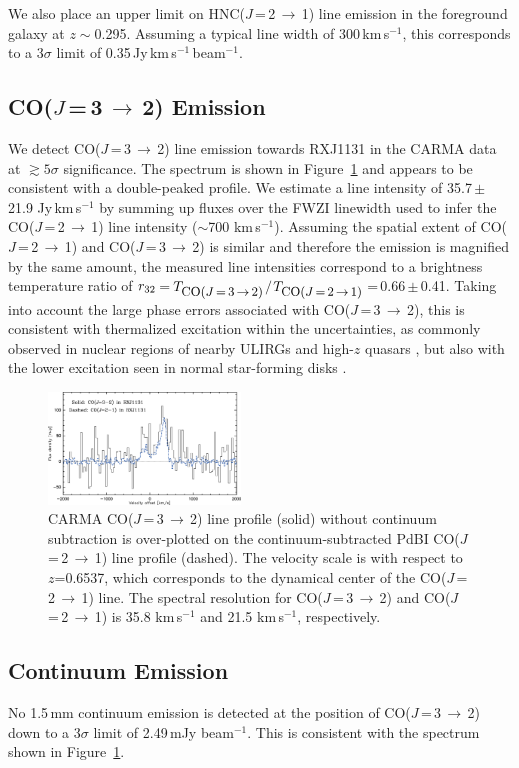 \documentclass[]{emulateapj}
\newcommand{\rarr}{$\rightarrow$}
\newcommand{\bco}{\mbox{CO($J$\,=\,2\,\rarr\,1)}\xspace}
\newcommand{\cco}{\mbox{CO($J$\,=\,3\,\rarr\,2)}\xspace}
\newcommand{\rot}[3][CO]{\mbox{#1($J$\,=\,#2\,\rarr\,#3)}}
\newcommand{\kms}{\mbox{km\,s$^{-1}$}\xspace}
\newcommand{\pmOne}{\mbox{$^{-1}$}\xspace}
\newcommand{\Fig}[1]{Figure~\ref{fig:#1}}
\begin{document}
We also place an upper limit on \rot[HNC]{2}{1} line emission
in the foreground galaxy at $z\sim$0.295.
Assuming a typical line width of 300\,\kms, this corresponds to a 3$\sigma$
limit of 0.35\,Jy\,\kms\,beam\pmOne.

\subsection{\cco Emission}
We detect \cco line emission towards RXJ1131 in the CARMA data at $\gtrsim5\sigma$ significance.
The spectrum is shown in \Fig{co32spec} and appears to be consistent with a
double-peaked profile. We estimate a line intensity of
35.7\,$\pm$\,21.9 Jy\,\kms by summing up fluxes over the FWZI
linewidth used to infer the \bco line intensity ($\sim$700 \kms).
Assuming the spatial extent of \bco and \cco is similar and therefore the emission is
magnified by the same amount, the measured line intensities
correspond to a brightness temperature ratio of
$r_{\rm 32}$\,=\,$T_{\small \cco}$$/$$T_{\small \bco}$\,=\,0.66\,$\pm$\,0.41.
Taking into account the large phase errors associated with \cco, this is consistent with
thermalized excitation within the uncertainties, as commonly observed in nuclear regions of
nearby ULIRGs and high-$z$ quasars \citep[e.g.,][]{Weiss07a, CW13}, but also
with the lower excitation seen in normal star-forming disks \citep[e.g.,][]{Dannerbauer09a, CW13}.

\begin{figure}[!htbp]
\includegraphics[width=0.455\textwidth]{f3.eps}
\caption{CARMA \cco line profile (solid) without continuum subtraction is
over-plotted on the continuum-subtracted PdBI \bco line profile (dashed).
The velocity scale is with respect to $z$=0.6537, which corresponds to the
dynamical center of the \bco line. The spectral resolution for \cco and \bco
is 35.8 \kms and 21.5 \kms, respectively.
\label{fig:co32spec}}
\end{figure}

\subsection{Continuum Emission}
No 1.5\,mm continuum emission is detected at the position of \cco
down to a 3$\sigma$ limit of 2.49\,mJy beam\pmOne.
This is consistent with the spectrum shown in \Fig{co32spec}.
\end{document}
